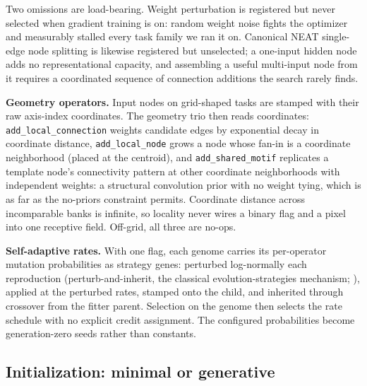\documentclass[11pt]{article}
\begin{document}
Two omissions are load-bearing. Weight perturbation is registered but never selected when gradient training is on: random weight noise fights the optimizer and measurably stalled every task family we ran it on. Canonical NEAT single-edge node splitting is likewise registered but unselected; a one-input hidden node adds no representational capacity, and assembling a useful multi-input node from it requires a coordinated sequence of connection additions the search rarely finds.

\textbf{Geometry operators.} Input nodes on grid-shaped tasks are stamped with their raw axis-index coordinates. The geometry trio then reads coordinates: \texttt{add_local_connection} weights candidate edges by exponential decay in coordinate distance, \texttt{add_local_node} grows a node whose fan-in is a coordinate neighborhood (placed at the centroid), and \texttt{add_shared_motif} replicates a template node's connectivity pattern at other coordinate neighborhoods with independent weights: a structural convolution prior with no weight tying, which is as far as the no-priors constraint permits. Coordinate distance across incomparable banks is infinite, so locality never wires a binary flag and a pixel into one receptive field. Off-grid, all three are no-ops.

\textbf{Self-adaptive rates.} With one flag, each genome carries its per-operator mutation probabilities as strategy genes: perturbed log-normally each reproduction (perturb-and-inherit, the classical evolution-strategies mechanism; \citealp{beyer2002}), applied at the perturbed rates, stamped onto the child, and inherited through crossover from the fitter parent. Selection on the genome then selects the rate schedule with no explicit credit assignment. The configured probabilities become generation-zero seeds rather than constants.

\subsection{Initialization: minimal or generative}
\end{document}
